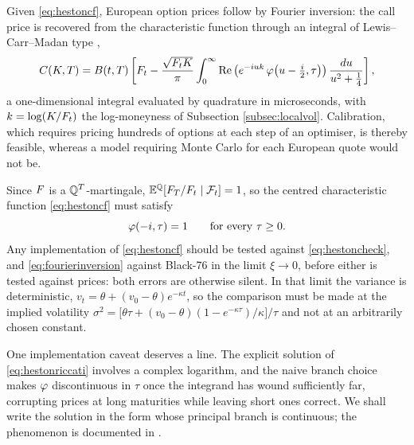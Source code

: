 Given \eqref{eq:hestoncf}, European option prices follow by Fourier inversion: the call price is 
recovered from the characteristic function through an integral of Lewis--Carr--Madan type \cite{lewis2001,carrmadan1999},
\begin{equation}\label{eq:fourierinversion}
C(K,T) = B(t,T)\left[ F_t - \frac{\sqrt{F_t K}}{\pi}\int_0^{\infty} 
\mathrm{Re}\left( e^{-iuk}\,\varphi\bigl(u - \tfrac{i}{2},\tau\bigr)\right)\frac{du}{u^2 + \tfrac14} \right],
\end{equation}
a one-dimensional integral evaluated by quadrature in microseconds, with $k = \log(K/F_t)$ 
the log-moneyness of Subsection \ref{subsec:localvol}. Calibration, which requires
pricing hundreds of options at each step of an optimiser, is thereby feasible, whereas a model
requiring Monte Carlo for each European quote would not be.

Since $F$ is a $\mathbb{Q}^{T}$-martingale, $\mathbb{E}^{\mathbb{Q}}[F_T/F_t \mid \mathcal{F}_t] = 1$, so the centred
characteristic function \eqref{eq:hestoncf} must satisfy
\begin{equation}\label{eq:hestoncheck}
\varphi(-i,\tau) = 1 \qquad \text{for every } \tau \geq 0 .
\end{equation}
Any implementation of \eqref{eq:hestoncf} should be tested against \eqref{eq:hestoncheck}, and
\eqref{eq:fourierinversion} against Black-76 in the limit $\xi \to 0$, before either is tested
against prices: both errors are otherwise silent. In that limit the variance is deterministic,
$v_t = \theta + (v_0-\theta)e^{-\kappa t}$, so the comparison must be made at the implied volatility
$\sigma^2 = \bigl[\theta\tau + (v_0-\theta)(1-e^{-\kappa\tau})/\kappa\bigr]/\tau$ and not at an
arbitrarily chosen constant.

One implementation caveat deserves a line. The 
explicit solution of \eqref{eq:hestonriccati} involves a complex logarithm, and the naive branch 
choice makes $\varphi$ discontinuous in $\tau$ once the integrand has wound sufficiently far, 
corrupting prices at long maturities while leaving short ones correct. We shall write the solution in the form whose principal branch is 
continuous; the phenomenon is documented in \cite{bergomi2016}.


